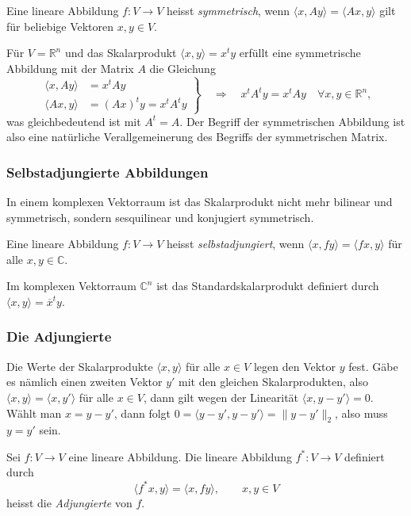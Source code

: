 \begin{definition}
Eine lineare Abbildung $f\colon V\to V$ heisst {\em symmetrisch}, wenn
$\langle x,Ay\rangle=\langle Ax,y\rangle$ gilt für beliebige 
Vektoren $x,y\in V$.
\end{definition}

Für $V=\mathbb{R}^n$ und das Skalarprodukt $\langle x,y\rangle=x^ty$ 
erfüllt eine symmetrische Abbildung mit der Matrix $A$ die Gleichung
\[
\left.
\begin{aligned}
\langle x,Ay\rangle
&=
x^tAy
\\
\langle Ax,y\rangle
&=
(Ax)^ty=x^tA^ty
\end{aligned}
\right\}
\quad\Rightarrow\quad
x^tA^ty = x^tAy\quad\forall x,y\in\mathbb{R}^n,
\]
was gleichbedeutend ist mit $A^t=A$.
Der Begriff der symmetrischen Abbildung ist also eine natürliche
Verallgemeinerung des Begriffs der symmetrischen Matrix.

\subsubsection{Selbstadjungierte Abbildungen}
In einem komplexen Vektorraum ist das Skalarprodukt nicht mehr bilinear
und symmetrisch, sondern sesquilinear und konjugiert symmetrisch.

\begin{definition}
Eine lineare Abbildung $f\colon V\to V$ heisst {\em selbstadjungiert},
wenn $\langle x,fy\rangle=\langle fx,y\rangle$ für alle $x,y\in\mathbb{C}$.
\end{definition}

Im komplexen Vektorraum $\mathbb{C}^n$ ist das Standardskalarprodukt
definiert durch $\langle x,y\rangle = \overline{x}^ty$.

\subsubsection{Die Adjungierte}
Die Werte der Skalarprodukte $\langle x, y\rangle$ für alle $x\in V$
legen den Vektor $y$ fest.
Gäbe es nämlich einen zweiten Vektor $y'$ mit den gleichen Skalarprodukten,
also $\langle x,y\rangle = \langle x,y'\rangle$ für alle $x\in V$,
dann gilt wegen der Linearität $\langle x,y-y'\rangle=0$.
Wählt man $x=y-y'$, dann folgt
$0=\langle y-y',y-y'\rangle=\|y-y'\|_2$, also muss $y=y'$ sein.

\begin{definition}
Sei $f\colon V\to V$ eine lineare Abbildung.
Die lineare Abbildung $f^*\colon V\to V$ definiert durch
\[
\langle f^*x,y\rangle = \langle x,fy\rangle,\qquad x,y\in V
\]
heisst die {\em Adjungierte} von $f$.
\end{definition}

